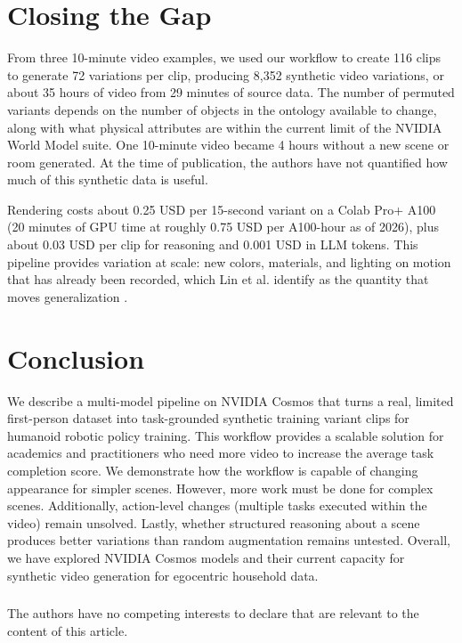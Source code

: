 \documentclass[runningheads]{llncs}
\begin{document}
\section{Closing the Gap}

From three 10-minute video examples, we used our workflow to create 116 clips to generate 72 variations per clip, producing 8,352 synthetic video variations, or about 35 hours of video from 29 minutes of source data. The number of permuted variants depends on the number of objects in the ontology available to change, along with what physical attributes are within the current limit of the NVIDIA World Model suite. One 10-minute video became 4 hours without a new scene or room generated. At the time of publication, the authors have not quantified how much of this synthetic data is useful.

Rendering costs about 0.25 USD per 15-second variant on a Colab Pro+ A100 (20 minutes of GPU time at roughly 0.75 USD per A100-hour as of 2026), plus about 0.03 USD per clip for reasoning and 0.001 USD in LLM tokens. This pipeline provides variation at scale: new colors, materials, and lighting on motion that has already been recorded, which Lin et al. identify as the quantity that moves generalization \cite{r4}.

\section{Conclusion}

We describe a multi-model pipeline on NVIDIA Cosmos that turns a real, limited first-person dataset into task-grounded synthetic training variant clips for humanoid robotic policy training. This workflow provides a scalable solution for academics and practitioners who need more video to increase the average task completion score. We demonstrate how the workflow is capable of changing appearance for simpler scenes. However, more work must be done for complex scenes. Additionally, action-level changes (multiple tasks executed within the video) remain unsolved. Lastly, whether structured reasoning about a scene produces better variations than random augmentation remains untested. Overall, we have explored NVIDIA Cosmos models and their current capacity for synthetic video generation for egocentric household data.

\begin{credits}
\subsubsection{\discintname}
The authors have no competing interests to declare that are relevant to the content of this article.
\end{credits}
\end{document}
